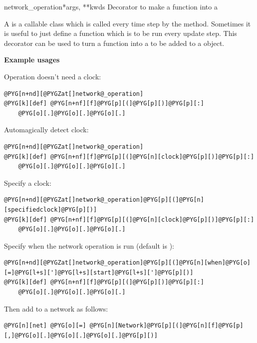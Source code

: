 \documentclass[letterpaper,10pt,english]{manual}
\begin{document}
\hypertarget{brian.network_operation}{}\begin{funcdesc}{network\_operation}{*args, **kwds}
Decorator to make a function into a \hyperlink{brian.NetworkOperation}{}

A \hyperlink{brian.NetworkOperation}{} is a callable class which is called every
time step by the \hyperlink{brian.Network}{}  method. Sometimes it is useful
to just define a function which is to be run every update step. This
decorator can be used to turn a function into a \hyperlink{brian.NetworkOperation}{}
to be added to a \hyperlink{brian.Network}{} object.

\textbf{Example usages}

Operation doesn't need a clock:

\begin{Verbatim}[commandchars=@\[\]]
@PYG[n+nd][@PYGZat[]network@_operation]
@PYG[k][def] @PYG[n+nf][f]@PYG[p][(]@PYG[p][)]@PYG[p][:]
    @PYG[o][.]@PYG[o][.]@PYG[o][.]
\end{Verbatim}

Automagically detect clock:

\begin{Verbatim}[commandchars=@\[\]]
@PYG[n+nd][@PYGZat[]network@_operation]
@PYG[k][def] @PYG[n+nf][f]@PYG[p][(]@PYG[n][clock]@PYG[p][)]@PYG[p][:]
    @PYG[o][.]@PYG[o][.]@PYG[o][.]
\end{Verbatim}

Specify a clock:

\begin{Verbatim}[commandchars=@\[\]]
@PYG[n+nd][@PYGZat[]network@_operation]@PYG[p][(]@PYG[n][specifiedclock]@PYG[p][)]
@PYG[k][def] @PYG[n+nf][f]@PYG[p][(]@PYG[n][clock]@PYG[p][)]@PYG[p][:]
    @PYG[o][.]@PYG[o][.]@PYG[o][.]
\end{Verbatim}

Specify when the network operation is run (default is ):

\begin{Verbatim}[commandchars=@\[\]]
@PYG[n+nd][@PYGZat[]network@_operation]@PYG[p][(]@PYG[n][when]@PYG[o][=]@PYG[l+s][']@PYG[l+s][start]@PYG[l+s][']@PYG[p][)]
@PYG[k][def] @PYG[n+nf][f]@PYG[p][(]@PYG[p][)]@PYG[p][:]
    @PYG[o][.]@PYG[o][.]@PYG[o][.]
\end{Verbatim}

Then add to a network as follows:

\begin{Verbatim}[commandchars=@\[\]]
@PYG[n][net] @PYG[o][=] @PYG[n][Network]@PYG[p][(]@PYG[n][f]@PYG[p][,]@PYG[o][.]@PYG[o][.]@PYG[o][.]@PYG[p][)]
\end{Verbatim}
\end{funcdesc}
\end{document}
